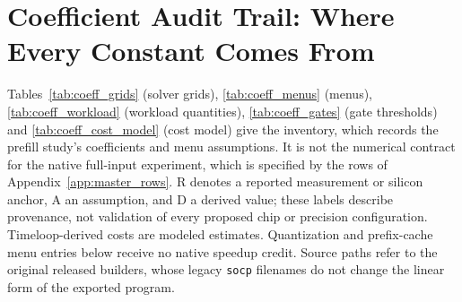 \section{Coefficient Audit Trail: Where Every Constant Comes From}
\label{app:coeff_provenance}

Tables~\ref{tab:coeff_grids} (solver grids), \ref{tab:coeff_menus} (menus), \ref{tab:coeff_workload} (workload quantities), \ref{tab:coeff_gates} (gate thresholds) and \ref{tab:coeff_cost_model} (cost model) give the inventory, which records the prefill study's coefficients and menu assumptions.
It is not the numerical contract for the native full-input experiment, which is specified by the rows of Appendix~\ref{app:master_rows}.
R denotes a reported measurement or silicon anchor, A an assumption, and D a derived value; these labels describe provenance, not validation of every proposed chip or precision configuration.
Timeloop-derived costs are modeled estimates.
Quantization and prefix-cache menu entries below receive no native speedup credit.
Source paths refer to the original released builders, whose legacy \texttt{socp} filenames do not change the linear form of the exported program.

